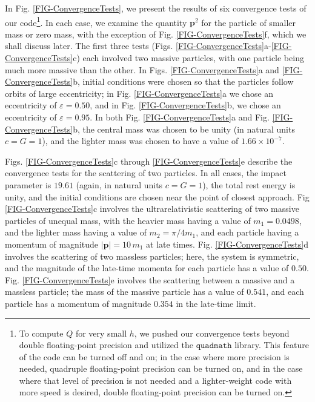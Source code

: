 \documentclass[aps,onecolumn,notitlepage,eqsecnum,nofootinbib,floatfix,superscriptaddress]{revtex4-1}
\begin{document}
In Fig. \ref{FIG-ConvergenceTests}, we present the results of six convergence tests of our code\footnote{To compute $Q$ for very small $h$, we pushed our convergence tests beyond double floating-point precision and utilized the $\mathtt{quadmath}$ library.  This feature of the code can be turned off and on; in the case where more precision is needed, quadruple floating-point precision can be turned on, and in the case where that level of precision is not needed and a lighter-weight code with more speed is desired, double floating-point precision can be turned on.}. In each case, we examine the quantity $\textbf{p}^2$ for the particle of smaller mass or zero mass, with the exception of Fig. \ref{FIG-ConvergenceTests}f, which we shall discuss later. The first three tests (Figs. \ref{FIG-ConvergenceTests}a-\ref{FIG-ConvergenceTests}c) each involved two massive particles, with one particle being much more massive than the other. In Figs. \ref{FIG-ConvergenceTests}a and \ref{FIG-ConvergenceTests}b, initial conditions were chosen so that the particles follow orbits of large eccentricity; in Fig. \ref{FIG-ConvergenceTests}a we chose an eccentricity of $\varepsilon=0.50$, and in Fig. \ref{FIG-ConvergenceTests}b, we chose an eccentricity of $\varepsilon=0.95$. In both Fig. \ref{FIG-ConvergenceTests}a and Fig. \ref{FIG-ConvergenceTests}b, the central mass was chosen to be unity (in natural units $c=G=1$), and the lighter mass was chosen to have a value of $1.66 \times 10^{-7}$.

Figs. \ref{FIG-ConvergenceTests}c through \ref{FIG-ConvergenceTests}e describe the convergence tests for the scattering of two particles. In all cases, the impact parameter is $19.61$ (again, in natural units $c=G=1$), the total rest energy is unity, and the initial conditions are chosen near the point of closest approach. Fig \ref{FIG-ConvergenceTests}c involves the ultrarelativistic scattering of two massive particles of unequal mass, with the heavier mass having a value of $m_1=0.0498$, and the lighter mass having a value of $m_2= \pi/4 m_1$, and each particle having a momentum of magnitude $|\textbf{p}|=10 \, m_1$ at late times. Fig. \ref{FIG-ConvergenceTests}d involves the scattering of two massless particles; here, the system is symmetric, and the magnitude of the late-time momenta for each particle has a value of $0.50$. Fig. \ref{FIG-ConvergenceTests}e involves the scattering between a massive and a massless particle; the mass of the massive particle has a value of $0.541$, and each particle has a momentum of magnitude $0.354$ in the late-time limit.
 
\end{document}
